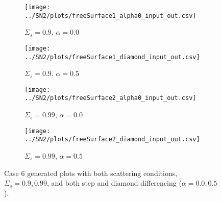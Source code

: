 \documentclass{NE515}
\theoremstyle{definition}
\begin{document}
    \begin{figure}
        \centering
        \begin{subfigure}{0.45\linewidth}
            \centering
            \texttt{[image: ../SN2/plots/freeSurface1\_alpha0\_input\_out.csv]}
            \caption{$\Sigma_s=0.9$, $\alpha=0.0$}
        \end{subfigure}
        \hfill
        \begin{subfigure}{0.45\linewidth}
            \centering
            \texttt{[image: ../SN2/plots/freeSurface1\_diamond\_input\_out.csv]}
            \caption{$\Sigma_s=0.9$, $\alpha=0.5$}
        \end{subfigure}
        \hfill
        \begin{subfigure}{0.45\linewidth}
            \centering
            \texttt{[image: ../SN2/plots/freeSurface2\_alpha0\_input\_out.csv]}
            \caption{$\Sigma_s=0.99$, $\alpha=0.0$}
        \end{subfigure}
        \hfill
        \begin{subfigure}{0.45\linewidth}
            \centering
            \texttt{[image: ../SN2/plots/freeSurface2\_diamond\_input\_out.csv]}
            \caption{$\Sigma_s=0.99$, $\alpha=0.5$}
        \end{subfigure}

        \caption{Case 6 generated plots with both scattering conditions, $\Sigma_s = 0.9, 0.99$, and both step and diamond differencing ($\alpha=0.0,0.5$).}
        \label{fig:case-6}
    \end{figure}
\end{document}
